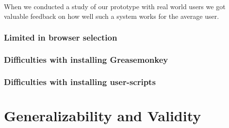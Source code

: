 \parabreak

When we conducted a study of our prototype with real world users
we got valuable feedback on how well such a system works for the average user.

\subsubsection{Limited in browser selection}

\subsubsection{Difficulties with installing Greasemonkey}

\subsubsection{Difficulties with installing user-scripts}

\section{Generalizability and Validity}
